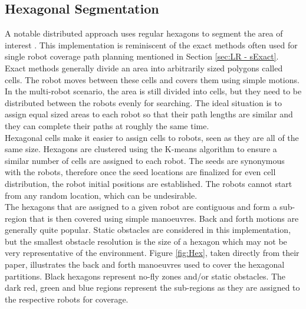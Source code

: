 \subsection{Hexagonal Segmentation}
\label{sec:LR-Hex}
A notable distributed approach uses regular hexagons to segment the area of interest \cite{Azpurua2018}. This implementation is reminiscent of the exact methods often used for single robot coverage path planning mentioned in Section \ref{sec:LR - sExact}. Exact methods generally divide an area into arbitrarily sized polygons called cells. The robot moves between these cells and covers them using simple motions. In the multi-robot scenario, the area is still divided into cells, but they need to be distributed between the robots evenly for searching. The ideal situation is to assign equal sized areas to each robot so that their path lengths are similar and they can complete their paths at roughly the same time.\\
Hexagonal cells make it easier to assign cells to robots, seen as they are all of the same size. Hexagons are clustered using the K-means algorithm to ensure a similar number of cells are assigned to each robot. The seeds are synonymous with the robots, therefore once the seed locations are finalized for even cell distribution, the robot initial positions are established. The robots cannot start from any random location, which can be undesirable. \\
The hexagons that are assigned to a given robot are contiguous and form a sub-region that is then covered using simple manoeuvres. Back and forth motions are generally quite popular. Static obstacles are considered in this implementation, but the smallest obstacle resolution is the size of a hexagon which may not be very representative of the environment. Figure \ref{fig:Hex}, taken directly from their paper, illustrates the back and forth manoeuvres used to cover the hexagonal partitions. Black hexagons represent no-fly zones and/or static obstacles. The dark red, green and blue regions represent the sub-regions as they are assigned to the respective robots for coverage.\\

